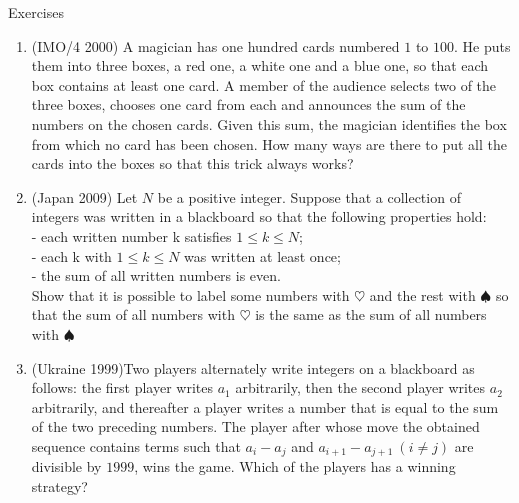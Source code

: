 \begin{xcb}{Exercises}
\begin{enumerate}
\item(IMO/4 2000) A magician has one hundred cards numbered $1$ to $100$. He puts them into three boxes, a red one, a white one and a blue one, so that each box contains at least one card. A member of the audience selects two of the three boxes, chooses one card from each and announces the sum of the numbers on the chosen cards. Given this sum, the magician identifies the box from which no card has been chosen. How many ways are there to put all the cards into the boxes so that this trick always works?\\
\item (Japan 2009)  Let $N$ be a positive integer. Suppose that a collection of integers was written in a blackboard so that the following properties hold:\\
- each written number k satisfies $1 \leq k \leq N$;\\
- each k with $1 \leq k \leq N$ was written at least once;\\
- the sum of all written numbers is even.\\
Show that it is possible to label some numbers with $\heartsuit$ and the rest with $\spadesuit$ so that the sum of all numbers with $\heartsuit$ is the same as the sum of all numbers with $\spadesuit$
\item (Ukraine 1999)Two players alternately write integers on a blackboard as follows: the first player writes $a_1$ arbitrarily, then the second player writes $a_2$ arbitrarily, and thereafter a player writes a number that is equal to the sum of the two preceding numbers. The player after whose move the obtained sequence contains terms such that $a_i-a_j$ and $a_{i+1}-a_{j+1}~(i\ne j)$ are divisible by $1999$, wins the game. Which of the players has a winning strategy?
\end{enumerate}
\end{xcb}